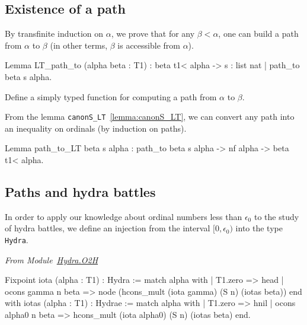 \subsection{Existence of a path}


By transfinite induction on $\alpha$, we prove that for any $\beta<\alpha$, 
one can build a path from $\alpha$ to $\beta$ (in other terms, $\beta$ is accessible from $\alpha$).

\begin{Coqsrc}
Lemma LT_path_to (alpha beta : T1) :
  beta t1< alpha -> {s : list nat | path_to beta s alpha}.
\end{Coqsrc}


\begin{exercise}
Define a simply typed function for computing a path from $\alpha$ to $\beta$.
\end{exercise}


\noindent 
From the lemma \texttt{canonS\_LT}~\vref{lemma:canonS_LT}, we can convert any path into an inequality on ordinals (by induction on paths).


\begin{Coqsrc}
Lemma path_to_LT beta s alpha :
  path_to beta s alpha -> nf alpha -> beta t1< alpha.
\end{Coqsrc}

\subsection{Paths and hydra battles}
\label{KS-o2h}

In order to apply our knowledge about  ordinal numbers less than $\epsilon_0$ to the study of hydra battles, we define an injection
from the interval $[0,\epsilon_0)$ into the type \texttt{Hydra}.

\vspace{4pt}

\emph{From Module~\href{../theories/html/hydras.Hydra.O2H.html}{Hydra.O2H}}


\begin{Coqsrc}
Fixpoint iota (alpha : T1) : Hydra :=
  match alpha with
  | T1.zero => head
  | ocons gamma n beta => 
         node (hcons_mult (iota gamma) (S n) (iotas beta))
  end 
with iotas (alpha : T1) :  Hydrae :=
       match alpha with
       | T1.zero => hnil
       | ocons alpha0 n beta  => 
           hcons_mult (iota alpha0) (S n) (iotas beta)
       end.
\end{Coqsrc}  




